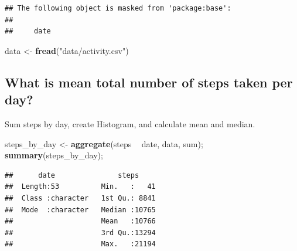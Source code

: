 \documentclass[]{article}
\newenvironment{Shaded}{\begin{snugshade}}{\end{snugshade}}
\newcommand{\KeywordTok}[1]{\textcolor[rgb]{0.13,0.29,0.53}{\textbf{#1}}}
\newcommand{\DataTypeTok}[1]{\textcolor[rgb]{0.13,0.29,0.53}{#1}}
\newcommand{\DecValTok}[1]{\textcolor[rgb]{0.00,0.00,0.81}{#1}}
\newcommand{\StringTok}[1]{\textcolor[rgb]{0.31,0.60,0.02}{#1}}
\newcommand{\OperatorTok}[1]{\textcolor[rgb]{0.81,0.36,0.00}{\textbf{#1}}}
\newcommand{\NormalTok}[1]{#1}
\begin{document}
\begin{verbatim}
## The following object is masked from 'package:base':
## 
##     date
\end{verbatim}

\begin{Shaded}
\begin{Highlighting}[]
\NormalTok{data <-}\StringTok{ }\KeywordTok{fread}\NormalTok{(}\StringTok{"data/activity.csv"}\NormalTok{)}
\end{Highlighting}
\end{Shaded}

\subsection{What is mean total number of steps taken per
day?}\label{what-is-mean-total-number-of-steps-taken-per-day}

Sum steps by day, create Histogram, and calculate mean and median.

\begin{Shaded}
\begin{Highlighting}[]
\NormalTok{steps_by_day <-}\StringTok{ }\KeywordTok{aggregate}\NormalTok{(steps }\OperatorTok{~}\StringTok{ }\NormalTok{date, data, sum);}
\KeywordTok{summary}\NormalTok{(steps_by_day);}
\end{Highlighting}
\end{Shaded}

\begin{verbatim}
##      date               steps      
##  Length:53          Min.   :   41  
##  Class :character   1st Qu.: 8841  
##  Mode  :character   Median :10765  
##                     Mean   :10766  
##                     3rd Qu.:13294  
##                     Max.   :21194
\end{verbatim}

\begin{Shaded}
\end{Shaded}
\end{document}
